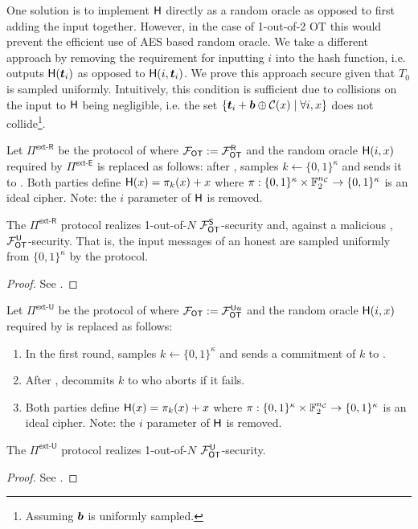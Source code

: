 One solution is to implement $\mathsf{H}$ directly as a random oracle as opposed to first adding the input together. However, in the case of 1-out-of-2 OT this would prevent the efficient use of AES based random oracle. We take a different approach by removing the requirement for inputting $i$ into the hash function, i.e. \rec outputs $\mathsf{H}(\boldsymbol{t}_i)$ as opposed to $\mathsf{H}(i,\boldsymbol{t}_i)$. We prove this approach secure given that $T_0$ is sampled uniformly. Intuitively, this condition is sufficient due to collisions on the input to $\mathsf{H}$ being negligible, i.e. the set $\{\boldsymbol{t}_i + \boldsymbol{b}\oplus\mathcal{C}(x) \mid \forall i,x\}$ does not collide\footnote{Assuming $\boldsymbol{b}$ is uniformly sampled.}.

\begin{definition}\label{def:ext_R_S}
	Let $\Pi^{\textsf{ext-R}}$ be the protocol of  where $\mathcal{F}_{\mathsf{OT}}:=\mathcal{F}_{\mathsf{OT}}^\mathsf{R}$ and the random oracle $\mathsf{H}(i,x)$ required by $\Pi^{\textsf{ext-E}}$ is replaced as follows: after , \send samples $k\gets\{0,1\}^{\kappa}$ and sends it to \rec. Both parties define $\mathsf{H}(x)=\pi_k(x)+x$ where $\pi:\{0,1\}^{\kappa} \times \mathbb{F}^{{n_\mathcal{C}}}_2 \rightarrow\{0,1\}^\kappa$ is an ideal cipher. Note: the $i$ parameter of $\mathsf{H}$ is removed.
\end{definition}
\begin{lemma}\label{lem:ext_R_S}
	The $\Pi^{\textsf{ext-R}}$ protocol realizes 1-out-of-$N$ $\mathcal{F}_{\mathsf{OT}}^\mathsf{S}$-security and, against a malicious \rec, $\mathcal{F}_{\mathsf{OT}}^\mathsf{U}$-security. That is, the input messages of an honest \send are sampled uniformly from $\{0,1\}^\kappa$ by the protocol.
\end{lemma}
\iffullversion

\else
\begin{proof}
	See .
\end{proof}
\fi

\begin{definition}\label{def:ext_U_U}
	Let $\Pi^{\textsf{ext-U}}$ be the protocol of  where $\mathcal{F}_{\mathsf{OT}}:=\mathcal{F}_{\mathsf{OT}}^{\mathsf{U} u}$ and the random oracle $\mathsf{H}(i,x)$ required by  is replaced as follows:
	\begin{enumerate}
		\item In the first round, \send samples $k\gets\{0,1\}^{\kappa}$ and sends a commitment of $k$ to \rec.
		\item After , \send decommits $k$ to \rec who aborts if it fails.
		\item Both parties define $\mathsf{H}(x)=\pi_k(x)+x$ where $\pi:\{0,1\}^{\kappa} \times \mathbb{F}^{{n_\mathcal{C}}}_2 \rightarrow\{0,1\}^\kappa$ is an ideal cipher. Note: the $i$ parameter of $\mathsf{H}$ is removed.
	\end{enumerate}
\end{definition}

\begin{lemma}\label{lem:ext_U_U}
	The $\Pi^{\textsf{ext-U}}$ protocol realizes 1-out-of-$N$ $\mathcal{F}_{\mathsf{OT}}^\mathsf{U}$-security.
\end{lemma}
\iffullversion

\else
\begin{proof}
See .
\end{proof}
\fi

